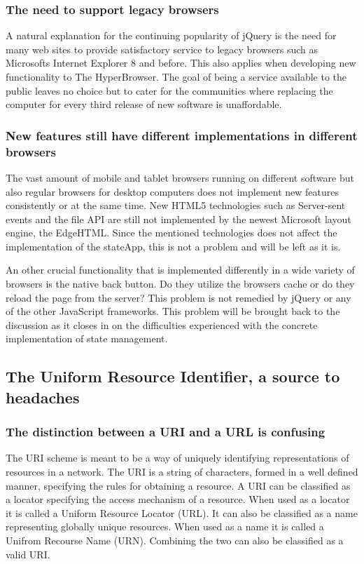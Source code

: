 \documentclass[english]{ifimaster}
\begin{document}
\subsubsection{The need to support legacy browsers}
A natural explanation for the continuing popularity of jQuery is the need for many web sites to provide satisfactory service to legacy browsers such as Microsofts Internet Explorer 8 and before. This also applies when developing new functionality to The HyperBrowser. The goal of being a service available to the public leaves no choice but to cater for the communities where replacing the computer for every third release of new software is unaffordable. 

\subsubsection{New features still have different implementations in different browsers}
The vast amount of mobile and tablet browsers running on different software but also regular browsers for desktop computers does not implement new features consistently or at the same time. New HTML5 technologies such as Server-sent events and the file API are still not implemented by the newest Microsoft layout engine, the EdgeHTML\parencite{comparison_of_layout_engines}. Since the mentioned technologies does not affect the implementation of the stateApp, this is not a problem and will be left as it is.

An other crucial functionality that is implemented differently in a wide variety of browsers is the native back button. Do they utilize the browsers cache or do they reload the page from the server? This problem is not remedied by jQuery or any of the other JavaScript frameworks. This problem will be brought back to the discussion as it closes in on the difficulties experienced with the concrete implementation of state management. 

\subsection{The Uniform Resource Identifier, a source to headaches}
\subsubsection{The distinction between a URI and a URL is confusing}
The URI scheme is meant to be a way of uniquely identifying representations of resources in a network. The URI is a string of characters, formed in a well defined manner, specifying the rules for obtaining a resource. A URI can be classified as a locator specifying the access mechanism of a resource. When used as a locator it is called a Uniform Resource Locator (URL). It can also be classified as a name representing globally unique resources. When used as a name it is called a Unifrom Recourse Name (URN). Combining the two can also be classified as a valid URI\parencite{rfc_URI}.
\end{document}
